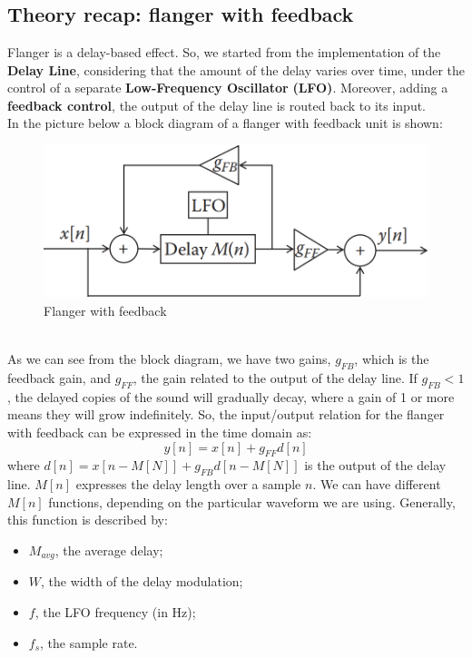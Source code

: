 \documentclass[a4paper,12pt]{report}
\begin{document}
\chapter{}
\section{Theory recap: flanger with feedback}
Flanger is a delay-based effect. So, we started from the implementation of the \textbf{Delay Line}, considering that the amount of the delay varies over time, under the control of a separate \textbf{Low-Frequency Oscillator} \textbf{(LFO)}. Moreover, adding a \textbf{feedback control}, the output of the delay line is routed back to its input. %
\\In the picture below a block diagram of a flanger with feedback unit is shown:
\begin{figure}[h]
\centering
\includegraphics[scale=.45]{db_flanger.png}
\caption{Flanger with feedback}
\end{figure}
\\As we can see from the block diagram, we have two gains, $\textit{g}_{FB}$, which is the feedback gain, and $\textit{g}_{FF}$, the gain related to the output of the delay line. If $\textit{g}_{FB}<1$, the delayed copies of the sound will gradually decay, where a gain of 1 or more means they will grow indefinitely.
So, the input/output relation for the flanger with feedback can be expressed in the time domain as:
\[ y[n] = x[n]+ g_{FF}d[n]\] where $d[n]=x[n-M[N]]+g_{FB}d[n-M[N]] $ is the output of the delay line. $M[n]$ expresses the delay length over a sample $n$. We can have different $M[n]$ functions, depending on the particular waveform we are using. Generally, this function is described by: 
\begin{itemize}
\item[\textperiodcentered] $M_{avg}$, the average delay;
\item[\textperiodcentered] $W$, the width of the delay modulation; 
\item[\textperiodcentered] $f$, the LFO frequency (in Hz);
\item[\textperiodcentered] $f_{s}$, the sample rate.
\end{itemize}
\end{document}
